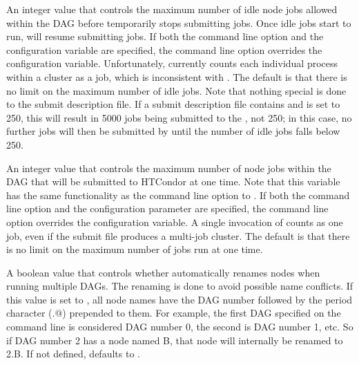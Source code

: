\begin{description}
\label{param:DAGManMaxJobsIdle}
\item[\Macro{DAGMAN\_MAX\_JOBS\_IDLE}]
  An integer value that controls the maximum number of idle node jobs
  allowed within the DAG before  temporarily stops
  submitting jobs.  Once idle jobs start to run,  will
  resume submitting jobs.  If both the command line option and the
  configuration variable are specified, the command line option overrides
  the configuration variable.  Unfortunately,
   currently counts each individual
  process within a cluster as a job, which is inconsistent with
  .  The default is that there is
  no limit on the maximum number of idle jobs. 
  Note that nothing special is 
  done to the submit description file.
  If a submit description file contains 
  and  is set to 250, 
  this will result in 5000 jobs being submitted to the ,
  not 250; in this case, no
  further jobs will then be submitted by  until the number of
  idle jobs falls below 250.

\label{param:DAGManMaxJobsSubmitted}
\item[\Macro{DAGMAN\_MAX\_JOBS\_SUBMITTED}]
  An integer value that controls the maximum number of node jobs within the
  DAG that will  be submitted to HTCondor at one time.  Note that this
  variable has the same functionality as the  
  command line option to .
  If both the command line option and the
  configuration parameter are specified, the command line option overrides
  the configuration variable.  A single invocation of 
  counts as one job, even if the submit file produces a multi-job cluster.
  The default is that there is no limit on the maximum number of jobs
  run at one time.

\label{param:DAGManMungeNodeNames}
\item[\Macro{DAGMAN\_MUNGE\_NODE\_NAMES}]
  A boolean value that controls whether  automatically
  renames nodes when running multiple DAGs.
  The renaming is done to avoid possible name conflicts.
  If this value is set to ,
  all node names have the DAG number followed by the period character
  (\verb@.@) prepended to them.
  For example, the first DAG specified on the 
  command line is considered DAG number 0, the second is DAG number 1, etc.
  So if DAG number 2 has a node named B,
  that node will internally be renamed to 2.B.
  If not defined,  defaults to .


\end{description}
